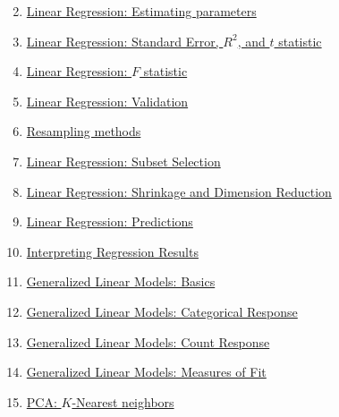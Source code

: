 \documentclass[12pt, titlepage, french]{report}
\begin{document}
\begin{ASM_chapter}
\begin{enumerate}
  \setcounter{enumi}{1}
	\item	\hyperref[LM-ESTIMATION]{Linear Regression:  Estimating parameters}
	\item	\hyperref[LM-STDERROR]{Linear Regression:  Standard Error, $R^{2}$, and $t$ statistic}
	\item	\hyperref[LM-F]{Linear Regression:  $F$ statistic}
	\tcbline
	\item	\hyperref[VALID-VALID]{Linear Regression:  Validation}
	\item	\hyperref[VALID-RESAMPLING]{Resampling methods}
	\item	\hyperref[VALID-SUBSETS]{Linear Regression:  Subset Selection}
	\item	\hyperref[VALID-SHRINKAGE]{Linear Regression:  Shrinkage and Dimension Reduction}
	\tcbline
	\item	\hyperref[PREV-PREDICTIONS]{Linear Regression:  Predictions}
	\item	\hyperref[PREV-INTERP]{Interpreting Regression Results}
	\tcbline
	\item	\hyperref[GLM-BASICS]{Generalized Linear Models:  Basics}
	\item	\hyperref[GLM-CAT]{Generalized Linear Models:  Categorical Response}
	\item	\hyperref[GLM-COUNT]{Generalized Linear Models:  Count Response}
	\item	\hyperref[GLM-MEZ-FIT]{Generalized Linear Models:  Measures of Fit}
	\tcbline
	\item	\hyperref[PCA-KNN]{PCA: $K$-Nearest neighbors}
\end{enumerate}
\end{ASM_chapter}
\end{document}
